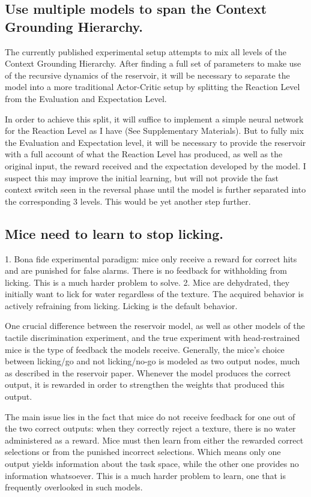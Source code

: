 \documentclass[11pt]{article}
\begin{document}
\subsection{Use multiple models to span the Context Grounding Hierarchy.}
The currently published experimental setup attempts to mix all levels of the Context Grounding Hierarchy.  After finding a full set of parameters to make use of the recursive dynamics of the reservoir, it will be necessary to separate the model into a more traditional Actor-Critic setup by splitting the Reaction Level from the Evaluation and Expectation Level.

In order to achieve this split, it will suffice to implement a simple neural network for the Reaction Level as I have (See Supplementary Materials).  But to fully mix the Evaluation and Expectation level, it will be necessary to provide the reservoir with a full account of what the Reaction Level has produced, as well as the original input, the reward received and the expectation developed by the model.  I suspect this may improve the initial learning, but will not provide the fast context switch seen in the reversal phase until the model is further separated into the corresponding 3 levels.  This would be yet another step further.

\subsection{Mice need to learn to stop licking.}
1. Bona fide experimental paradigm: mice only receive a reward for correct hits and are punished for false alarms.  There is no feedback for withholding from licking.  This is a much harder problem to solve.
2. Mice are dehydrated, they initially want to lick for water regardless of the texture.  The acquired behavior is actively refraining from licking.  Licking is the default behavior.

One crucial difference between the reservoir model, as well as other models of the tactile discrimination experiment, and the true experiment with head-restrained mice is the type of feedback the models receive.  Generally, the mice's choice between licking/go and not licking/no-go is modeled as two output nodes, much as described in the reservoir paper.  Whenever the model produces the correct output, it is rewarded in order to strengthen the weights that produced this output.  

The main issue lies in the fact that mice do not receive feedback for one out of the two correct outputs: when they correctly reject a texture, there is no water administered as a reward.  Mice must then learn from either the rewarded correct selections or from the punished incorrect selections.  Which means only one output yields information about the task space, while the other one provides no information whatsoever.  This is a much harder problem to learn, one that is frequently overlooked in such models.
\end{document}

